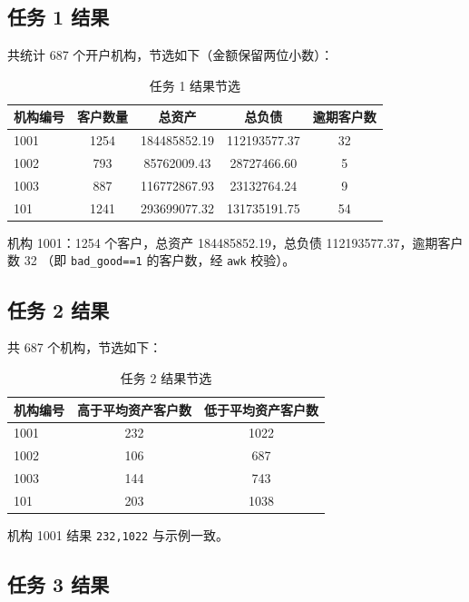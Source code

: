 \documentclass[UTF8,a4paper,12pt]{ctexart}
\begin{document}
\subsection{任务 1 结果}

共统计 687 个开户机构，节选如下（金额保留两位小数）：

\begin{table}[H]
  \centering
  \caption{任务 1 结果节选}
  \label{tab:t1}
  \begin{tabular}{lcccc}
    \toprule
    机构编号 & 客户数量 & 总资产 & 总负债 & 逾期客户数 \\
    \midrule
    1001 & 1254 & 184485852.19 & 112193577.37 & 32 \\
    1002 & 793  & 85762009.43  & 28727466.60  & 5  \\
    1003 & 887  & 116772867.93 & 23132764.24  & 9  \\
    101  & 1241 & 293699077.32 & 131735191.75 & 54 \\
    \bottomrule
  \end{tabular}
\end{table}

机构 1001：1254 个客户，总资产 184485852.19，总负债 112193577.37，逾期客户数 32
（即 \texttt{bad\_good==1} 的客户数，经 \texttt{awk} 校验）。

\subsection{任务 2 结果}

共 687 个机构，节选如下：

\begin{table}[H]
  \centering
  \caption{任务 2 结果节选}
  \label{tab:t2}
  \begin{tabular}{lcc}
    \toprule
    机构编号 & 高于平均资产客户数 & 低于平均资产客户数 \\
    \midrule
    1001 & 232 & 1022 \\
    1002 & 106 & 687  \\
    1003 & 144 & 743  \\
    101  & 203 & 1038 \\
    \bottomrule
  \end{tabular}
\end{table}

机构 1001 结果 \texttt{232,1022} 与示例一致。

\subsection{任务 3 结果}
\end{document}
